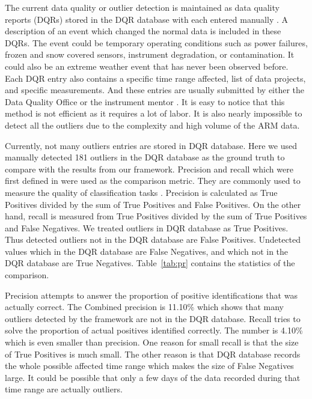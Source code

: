 The current data quality or outlier detection is maintained as data 
quality reports (DQRs) stored in the DQR database with each entered 
manually \cite{mccord2016arm}. A description of an event which 
changed the normal data is included in these DQRs. The event could 
be temporary operating conditions such as power failures, frozen 
and snow covered sensors, instrument degradation, or contamination. 
It could also be an extreme weather event that has never been observed 
before. Each DQR entry also contains a specific time range affected, 
list of data projects, and specific measurements. And these entries 
are usually submitted by either the Data Quality Office \cite{peppler2016arm} 
or the instrument mentor \cite{cress2016deploying}. It is easy to 
notice that this method is not efficient as it requires a lot of labor. 
It is also nearly impossible to detect all the outliers due to the 
complexity and high volume of the ARM data.

Currently, not many outliers entries are stored in DQR database. Here we 
used manually detected 181 outliers in the DQR database as the ground 
truth to compare with the results from our framework. Precision and 
recall which were first defined in \cite{perry1955machine} were used 
as the comparison metric. They are commonly used to measure the quality 
of classification tasks \cite{olson2008advanced}. Precision is calculated 
as True Positives divided by the sum of True Positives and False 
Positives. On the other hand, recall is measured from True Positives 
divided by the sum of True Positives and False Negatives. We treated 
outliers in DQR database as True Positives. Thus detected outliers not 
in the DQR database are False Positives. Undetected values which in 
the DQR database are False Negatives, and which not in the DQR database 
are True Negatives. Table~\ref{tab:pr} contains the statistics of 
the comparison.

Precision attempts to answer the proportion of positive identifications that
was actually correct. The Combined precision is 11.10\% which shows that 
many outliers detected by the framework are not in the DQR database. 
Recall tries to solve the proportion of actual positives identified 
correctly. The number is 4.10\% which is even smaller than precision. 
One reason for small recall is that the size of True Positives 
is much small. The other reason is that DQR database records the whole 
possible affected time range which makes the size of False Negatives 
large. It could be possible that only a few days of the data recorded 
during that time range are actually outliers.

